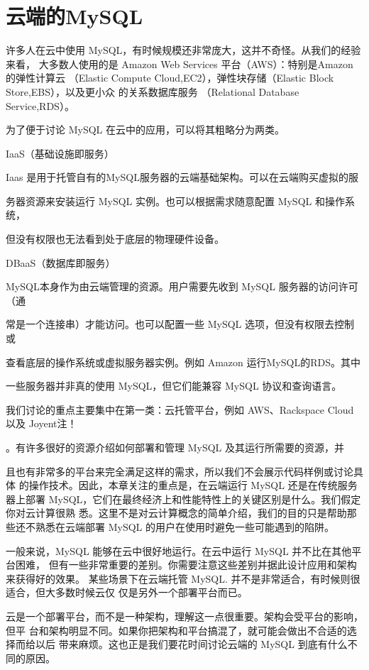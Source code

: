 \chapter{云端的MySQL}
许多人在云中使用 MySQL，有时候规模还非常庞大，这并不奇怪。从我们的经验来看，
大多数人使用的是 Amazon Web Services 平台（AWS）：特别是Amazon 的弹性计算云
（Elastic Compute Cloud,EC2），弹性块存储（Elastic Block Store,EBS），以及更小众
的关系数据库服务 （Relational Database Service,RDS）。

为了便于讨论 MySQL 在云中的应用，可以将其粗略分为两类。

IaaS（基础设施即服务）

Iaas 是用于托管自有的MySQL服务器的云端基础架构。可以在云端购买虚拟的服

务器资源来安装运行 MySQL 实例。也可以根据需求随意配置 MySQL 和操作系统，

但没有权限也无法看到处于底层的物理硬件设备。

DBaaS（数据库即服务）

MySQL本身作为由云端管理的资源。用户需要先收到 MySQL 服务器的访问许可（通

常是一个连接串）才能访问。也可以配置一些 MySQL 选项，但没有权限去控制或

查看底层的操作系统或虚拟服务器实例。例如 Amazon 运行MySQL的RDS。其中

一些服务器并非真的使用 MySQL，但它们能兼容 MySQL 协议和查询语言。

我们讨论的重点主要集中在第一类：云托管平台，例如 AWS、Rackspace Cloud 以及
Joyent注！

。有许多很好的资源介绍如何部署和管理 MySQL 及其运行所需要的资源，并

且也有非常多的平台来完全满足这样的需求，所以我们不会展示代码样例或讨论具体
的操作技术。因此，本章关注的重点是，在云端运行 MySQL 还是在传统服务器上部署
MySQL，它们在最终经济上和性能特性上的关键区别是什么。我们假定你对云计算很熟
悉。这里不是对云计算概念的简单介绍，我们的目的只是帮助那些还不熟悉在云端部署
MySQL 的用户在使用时避免一些可能遇到的陷阱。

一般来说，MySQL 能够在云中很好地运行。在云中运行 MySQL 并不比在其他平台困难，
但有一些非常重要的差别。你需要注意这些差别并据此设计应用和架构来获得好的效果。
某些场景下在云端托管 MySQL. 并不是非常适合，有时候则很适合，但大多数时候云仅
仅是另外一个部署平台而已。

云是一个部署平台，而不是一种架构，理解这一点很重要。架构会受平台的影响，但平
台和架构明显不同。如果你把架构和平台搞混了，就可能会做出不合适的选择而给以后
带来麻烦。这也正是我们要花时间讨论云端的 MySQL 到底有什么不同的原因。

